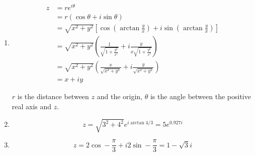 \documentclass{article}
\begin{document}
\setcounter{subsection}{44}
\subsection{}

\begin{enumerate}
  \item

        \begin{align*}
          z & = r e^{i \theta}                                                                                                      \\
            & = r (\cos \theta + i \sin \theta)                                                                                     \\
            & = \sqrt{x^2 + y^2} \left[ \cos \left( \arctan \frac{y}{x} \right) + i \sin \left( \arctan \frac{y}{x} \right) \right] \\
            & = \sqrt{x^2 + y^2} \left( \frac{1}{\sqrt{1 + \frac{y^2}{x^2}}} + i \frac{y}{x \sqrt{1 + \frac{y^2}{x^2}}} \right)     \\
            & = \sqrt{x^2 + y^2} \left( \frac{x}{\sqrt{x^2 + y^2}} + i \frac{y}{\sqrt{x^2 + y^2}} \right)                           \\
            & = x + i y
        \end{align*}

        $r$ is the distance between $z$ and the origin, $\theta$ is the angle between the positive real axis and $z$.

  \item \[z = \sqrt{3^2 + 4^2} e^{i \arctan 4 / 3} = 5 e^{0.927 i}\]

  \item \[z = 2 \cos -\frac{\pi}{3} + i 2 \sin -\frac{\pi}{3} = 1 - \sqrt{3} i\]
\end{enumerate}

\setcounter{subsection}{46}
\subsection{}
\end{document}
